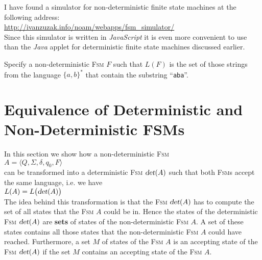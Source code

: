 \noindent
I have found a simulator for non-deterministic finite state machines at the following address:
\\[0.2cm]
\hspace*{1.3cm}
\href{http://ivanzuzak.info/noam/webapps/fsm_simulator/}{http://ivanzuzak.info/noam/webapps/fsm\_simulator/}
\\[0.2cm]
Since this simulator is written in \textsl{JavaScript} it is even more convenient to use than the
\textsl{Java} applet for deterministic finite state machines discussed earlier.

\exerciseEng
Specify a non-deterministic \textsc{Fsm} $F$ such that $L(F)$ is the set of those
strings from the language  $\{a,b\}^*$ that contain the substring ``\texttt{aba}''. \eox

\section{Equivalence of  Deterministic and Non-Deterministic  FSMs}
In this section we show how a non-deterministic \textsc{Fsm} 
\\[0.2cm]
\hspace*{1.3cm}
$A = \langle Q, \Sigma, \delta, q_0, F \rangle$ 
\\[0.2cm]
can be transformed into a deterministic \textsc{Fsm} $\textsl{det}(A)$ such that both \textsc{Fsm}s accept the
same language, i.e. we have
\\[0.2cm]
\hspace*{1.3cm}
$L(A) = L\bigl(\textsl{det}(A)\bigr)$
\\[0.2cm]
The idea behind this transformation is that the \textsc{Fsm} $\textsl{det}(A)$ has to compute the set of all states that the
\textsc{Fsm} $A$ could be in.   Hence the states of the deterministic \textsc{Fsm} $\textsl{det}(A)$ are 
\textbf{sets} of states of the non-deterministic \textsc{Fsm} $A$.  A set of these states contains all those 
states that the non-deterministic \textsc{Fsm} $A$ could have reached.
Furthermore, a set $M$ of states of the \textsc{Fsm} $A$ is an accepting state of the \textsc{Fsm}
$\textsl{det}(A)$ if the set $M$ contains an accepting state of the \textsc{Fsm} $A$.

